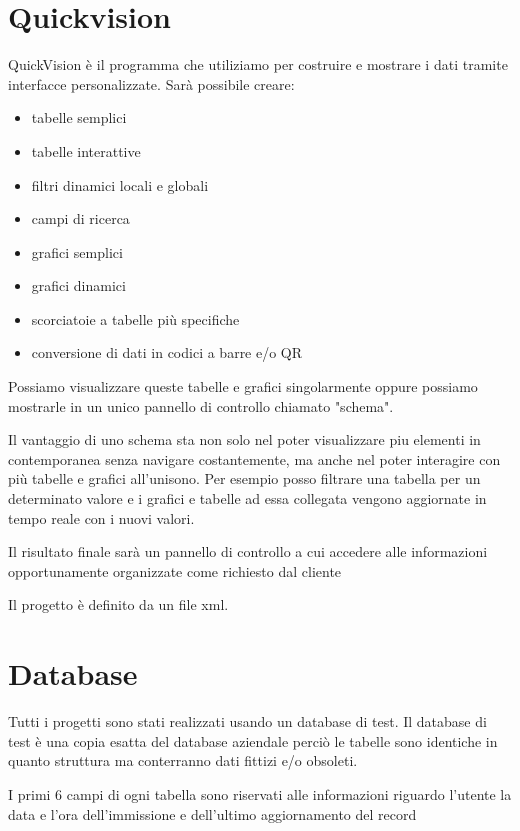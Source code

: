 \documentclass[target=bach,aauheader=,style=]{thud}
\begin{document}
\section{Quickvision}
QuickVision è il programma che utiliziamo per costruire e mostrare i dati tramite interfacce personalizzate.
Sarà possibile creare:

\begin{itemize}
    \item tabelle semplici
    \item tabelle interattive
    \item filtri dinamici locali e globali
    \item campi di ricerca
    \item grafici semplici
    \item grafici dinamici
    \item scorciatoie a tabelle più specifiche
    \item conversione di dati in codici a barre e/o QR
\end{itemize}

Possiamo visualizzare queste tabelle e grafici singolarmente oppure possiamo mostrarle in un unico pannello di controllo chiamato "schema".

Il vantaggio di uno schema sta non solo nel poter visualizzare piu elementi in contemporanea senza navigare costantemente, ma anche nel poter interagire con più tabelle e grafici all'unisono.
Per esempio posso filtrare una tabella per un determinato valore e i grafici e tabelle ad essa collegata vengono aggiornate in tempo reale con i nuovi valori.

Il risultato finale sarà un pannello di controllo a cui accedere alle informazioni opportunamente organizzate come richiesto dal cliente

Il progetto è definito da un file xml.


\section{Database}
Tutti i progetti sono stati realizzati usando un database di test.
Il database di test è una copia esatta del database aziendale perciò le tabelle sono identiche in quanto struttura ma conterranno dati fittizi e/o obsoleti.

I primi 6 campi di ogni tabella sono riservati alle informazioni riguardo l'utente la data e l'ora dell'immissione e dell'ultimo aggiornamento del record
\end{document}
